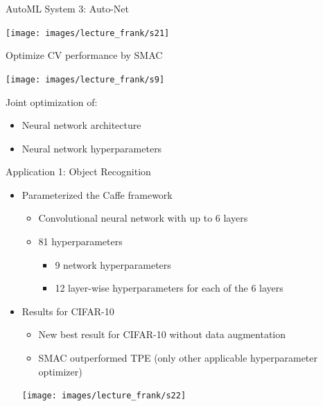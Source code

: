 \begin{frame}[c]{AutoML System 3: Auto-Net}

{\centering
	\texttt{[image: images/lecture\_frank/s21]}
}
\begin{itemize}
	\begin{minipage}{0.55\textwidth}
		\item Optimize CV performance by SMAC
	\end{minipage}
	\begin{minipage}{0.26\textwidth}
		{\centering
			\texttt{[image: images/lecture\_frank/s9]}
		}
	\end{minipage}
	\item Joint optimization of:
	\begin{itemize}
		\item Neural network architecture
		\item Neural network hyperparameters
	\end{itemize}
\end{itemize}
\end{frame}
\begin{frame}[c]{Application 1: Object Recognition}
\vspace*{-1.25cm}
\begin{itemize}
	\item Parameterized the Caffe framework 
	\begin{itemize}
		\item Convolutional neural network with up to 6 layers
		\item \alert{81 hyperparameters}
		\begin{itemize}
			\item 9 network hyperparameters
			\item 12 layer-wise hyperparameters for each of the 6 layers
		\end{itemize}
	\end{itemize}
	\item Results for CIFAR-10\\
	\begin{minipage}{0.55\textwidth}
		\begin{itemize}
			\item \alert{New best result for CIFAR-10
			without data augmentation}
			\item SMAC outperformed TPE
			(only other applicable
			hyperparameter optimizer)
		\end{itemize}
	\end{minipage}
	\begin{minipage}{0.26\textwidth}
		{\centering
			\texttt{[image: images/lecture\_frank/s22]}
		}
	\end{minipage}
\end{itemize}
\end{frame}
